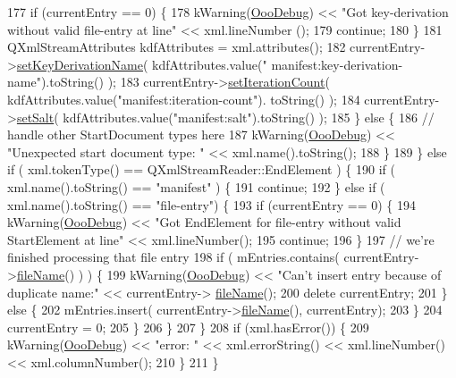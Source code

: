 \begin{DoxyCode}
177     \textcolor{keywordflow}{if} (currentEntry == 0) \{
178       kWarning(\hyperlink{debug_8h_a7cc98d68e6cad31e47e0f4c94664c0da}{OooDebug}) << \textcolor{stringliteral}{"Got key-derivation without valid file-entry at line"} << xml.lineNumber
      ();
179       \textcolor{keywordflow}{continue};
180     \}
181     QXmlStreamAttributes kdfAttributes = xml.attributes();
182     currentEntry->\hyperlink{classOOO_1_1ManifestEntry_a6d1398f193f038fd3e605df33564154b}{setKeyDerivationName}( kdfAttributes.value(\textcolor{stringliteral}{"
      manifest:key-derivation-name"}).toString() );
183     currentEntry->\hyperlink{classOOO_1_1ManifestEntry_ab78f36fcf7d297649148a1e97f810328}{setIterationCount}( kdfAttributes.value(\textcolor{stringliteral}{"manifest:iteration-count"}).
      toString() );
184     currentEntry->\hyperlink{classOOO_1_1ManifestEntry_a94422c9f4b80209ec1fdf876b0832c7d}{setSalt}( kdfAttributes.value(\textcolor{stringliteral}{"manifest:salt"}).toString() );
185       \} \textcolor{keywordflow}{else} \{
186     \textcolor{comment}{// handle other StartDocument types here }
187     kWarning(\hyperlink{debug_8h_a7cc98d68e6cad31e47e0f4c94664c0da}{OooDebug}) << \textcolor{stringliteral}{"Unexpected start document type: "} << xml.name().toString();
188       \}
189     \} \textcolor{keywordflow}{else} \textcolor{keywordflow}{if} ( xml.tokenType() == QXmlStreamReader::EndElement ) \{
190       \textcolor{keywordflow}{if} ( xml.name().toString() == \textcolor{stringliteral}{"manifest"} ) \{
191     \textcolor{keywordflow}{continue};
192       \} \textcolor{keywordflow}{else} \textcolor{keywordflow}{if} ( xml.name().toString() == \textcolor{stringliteral}{"file-entry"}) \{
193     \textcolor{keywordflow}{if} (currentEntry == 0) \{
194       kWarning(\hyperlink{debug_8h_a7cc98d68e6cad31e47e0f4c94664c0da}{OooDebug}) << \textcolor{stringliteral}{"Got EndElement for file-entry without valid StartElement at line"} << 
      xml.lineNumber();
195       \textcolor{keywordflow}{continue};
196     \}
197     \textcolor{comment}{// we're finished processing that file entry}
198     \textcolor{keywordflow}{if} ( mEntries.contains( currentEntry->\hyperlink{classOOO_1_1ManifestEntry_ae1238ad127da660fdef017046a94b5aa}{fileName}() ) ) \{
199       kWarning(\hyperlink{debug_8h_a7cc98d68e6cad31e47e0f4c94664c0da}{OooDebug}) << \textcolor{stringliteral}{"Can't insert entry because of duplicate name:"} << currentEntry->
      \hyperlink{classOOO_1_1ManifestEntry_ae1238ad127da660fdef017046a94b5aa}{fileName}();
200       \textcolor{keyword}{delete} currentEntry;
201     \} \textcolor{keywordflow}{else} \{
202       mEntries.insert( currentEntry->\hyperlink{classOOO_1_1ManifestEntry_ae1238ad127da660fdef017046a94b5aa}{fileName}(), currentEntry);
203     \}
204         currentEntry = 0;
205       \}
206     \}
207   \}
208   \textcolor{keywordflow}{if} (xml.hasError()) \{
209     kWarning(\hyperlink{debug_8h_a7cc98d68e6cad31e47e0f4c94664c0da}{OooDebug}) << \textcolor{stringliteral}{"error: "} << xml.errorString() << xml.lineNumber() << xml.columnNumber();
210   \}
211 \}
\end{DoxyCode}
